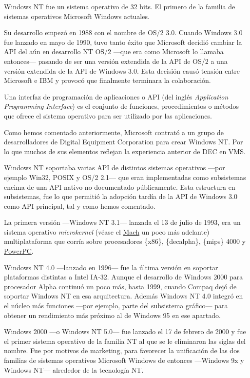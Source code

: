 Windows NT fue un sistema operativo de 32 bits. El primero de la familia
de sistemas operativos Microsoft Windows actuales.

Su desarrollo empezó en 1988 con el nombre de OS/2 3.0. Cuando Windows
3.0 fue lanzado en mayo de 1990, tuvo tanto éxito que Microsoft decidió
cambiar la API del aún en desarrollo NT OS/2 ---que era como Microsoft
lo llamaba entonces--- pasando de ser una versión extendida de la API de
OS/2 a una versión extendida de la API de Windows 3.0. Esta decisión
causó tensión entre Microsoft e IBM y provocó que finalmente terminara
la colaboración.

Una interfaz de programación de aplicaciones o API (del inglés
\emph{Application Programming Interface}) es el conjunto de funciones,
procedimientos o métodos que ofrece el sistema operativo para ser
utilizado por las aplicaciones.

Como hemos comentado anteriormente, Microsoft contrató a un grupo de
desarrolladores de Digital Equipment Corporation para crear Windows NT.
Por lo que muchos de sus elementos reflejan la experiencia anterior de
DEC en VMS.

Windows NT soportaba varias API de distintos sistemas operativos ---por
ejemplo Win32, POSIX y OS/2 2.1--- que eran implementadas como
subsistemas encima de una API nativo no documentado públicamente. Esta
estructura en subsistemas, fue lo que permitió la adopción tardía de la
API de Windows 3.0 como API principal, tal y como hemos comentado.

La primera versión ---Windows NT 3.1--- lanzada el 13 de julio de 1993,
era un sistema operativo \emph{microkernel} (véase el
\hyperref[_mach]{Mach} un poco más adelante) multiplataforma que corría
sobre procesadores \{x86\}, \{decalpha\}, \{mips\} 4000 y
\href{https://es.wikipedia.org/wiki/PowerPC}{PowerPC}.

Windows NT 4.0 ---lanzado en 1996--- fue la última versión en soportar
plataformas distintas a Intel IA-32. Aunque el desarrollo de Windows
2000 para procesador Alpha continuó un poco más, hasta 1999, cuando
Compaq dejó de soportar Windows NT en esa arquitectura. Además Windows
NT 4.0 integró en el núcleo más funciones ---por ejemplo, parte del
subsistema gráfico--- para obtener un rendimiento más próximo al de
Windows 95 en ese apartado.

Windows 2000 ---o Windows NT 5.0--- fue lanzado el 17 de febrero de 2000
y fue el primer sistema operativo de la familia NT al que se le
eliminaron las siglas del nombre. Fue por motivos de marketing, para
favorecer la unificación de las dos familias de sistemas operativos
Microsoft Windows de entonces ---Windows 9x y Windows NT--- alrededor de
la tecnología NT.

